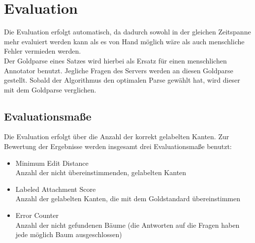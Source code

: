\documentclass{scrartcl}
\begin{document}
\section{Evaluation}
Die Evaluation erfolgt automatisch, da dadurch sowohl in der gleichen Zeitspanne mehr evaluiert werden kann als es von Hand möglich wäre als auch menschliche Fehler vermieden werden.\\ Der Goldparse eines Satzes wird hierbei als Ersatz für einen menschlichen Annotator benutzt. Jegliche Fragen des Servers werden an diesen Goldparse gestellt. Sobald der Algorithmus den optimalen Parse gewählt hat, wird dieser mit dem Goldparse verglichen.\\
\subsection{Evaluationsma{\ss}e}
Die Evaluation erfolgt über die Anzahl der korrekt gelabelten Kanten.
Zur Bewertung der Ergebnisse werden insgesamt drei Evaluationsmaße benutzt:
\begin{itemize}
\item Minimum Edit Distance\\
Anzahl der nicht übereinstimmenden, gelabelten Kanten
\item Labeled Attachment Score\\
Anzahl der gelabelten Kanten, die mit dem Goldstandard übereinstimmen
\item Error Counter\\
Anzahl der nicht gefundenen Bäume (die Antworten auf die Fragen haben jede möglich Baum ausgeschlossen)
\end{itemize}
\end{document}
